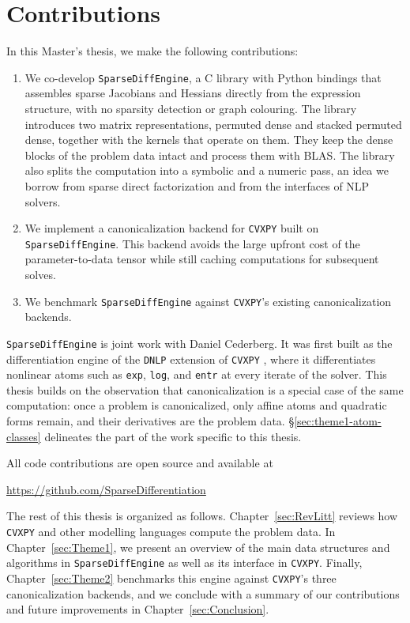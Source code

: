 \section{Contributions}\label{sec:contributions}
In this Master's thesis, we make the following contributions:
\begin{enumerate}
  \item We co-develop \texttt{SparseDiffEngine}, a C library with Python bindings that assembles
  sparse Jacobians and Hessians directly from the expression structure, with no sparsity
  detection or graph colouring. The library introduces two matrix representations, permuted
  dense and stacked permuted dense, together with the kernels that operate on them. They keep the dense blocks of the problem data intact and process
  them with \ac{BLAS}. The library also splits the computation into a symbolic and a
  numeric pass, an idea we borrow from sparse direct factorization and from the interfaces
  of \ac{NLP} solvers.
  \item We implement a canonicalization backend for \texttt{CVXPY} built on
  \texttt{SparseDiffEngine}. This backend avoids the large upfront cost of the
  parameter-to-data tensor while still caching computations for subsequent solves.
  \item We benchmark \texttt{SparseDiffEngine} against \texttt{CVXPY}'s existing canonicalization
  backends.
\end{enumerate}
\texttt{SparseDiffEngine} is joint work with Daniel Cederberg. It was first built as the
differentiation engine of the \texttt{DNLP} extension of \texttt{CVXPY}
\cite{cederberg2025disciplined}, where it differentiates nonlinear atoms such as
\texttt{exp}, \texttt{log}, and \texttt{entr} at every iterate of the solver. This thesis
builds on the observation that canonicalization is a special case of the same computation:
once a problem is canonicalized, only affine atoms and quadratic forms remain, and their
derivatives are the problem data. \S\ref{sec:theme1-atom-classes} delineates the part of the
work specific to this thesis.

All code contributions are open source and available at
\begin{center}
\url{https://github.com/SparseDifferentiation}
\end{center}

The rest of this thesis is organized as follows.
Chapter~\ref{sec:RevLitt} reviews how \texttt{CVXPY} and other modelling languages compute
the problem data.
In Chapter~\ref{sec:Theme1}, we present an overview of the main data structures and
algorithms in \texttt{SparseDiffEngine} as well as its interface in \texttt{CVXPY}.
Finally, Chapter~\ref{sec:Theme2} benchmarks this engine against \texttt{CVXPY}'s three
canonicalization backends, and we conclude with a summary of our contributions
and future improvements in Chapter~\ref{sec:Conclusion}.
